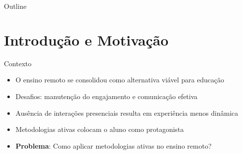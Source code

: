 \documentclass[aspectratio=169]{beamer}
\begin{document}
{%
\begin{frame}{Outline}
  \tableofcontents
\end{frame}

\section{Introdução e Motivação}

\begin{frame}{Contexto}
  \begin{itemize}
  \item O ensino remoto se consolidou como alternativa viável para educação
  \item Desafios: manutenção do engajamento e comunicação efetiva
  \item Ausência de interações presenciais resulta em experiência menos dinâmica
  \item Metodologias ativas colocam o aluno como protagonista
  \item \textbf{Problema}: Como aplicar metodologias ativas no ensino remoto?
  \end{itemize}
\end{frame}

}
\end{document}
